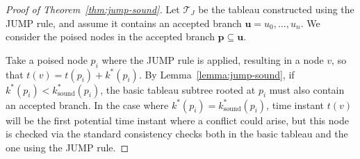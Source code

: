 \documentclass{easychair}
\begin{document}
\begin{proof}[Proof of Theorem~\ref{thm:jump-sound}]
    Let $\mathcal{T}_J$ be the tableau constructed using the JUMP rule, and assume it contains an accepted branch $\mathbf{u} = u_0, \dots, u_n$. We consider the poised nodes in the accepted branch $\mathbf{p} \subseteq \mathbf{u}$. 

    Take a poised node $p_i$ where the JUMP rule is applied, resulting in a node $v$, so that $t(v) = t(p_i) + k^{\ast}(p_i)$. By Lemma~\ref{lemma:jump-sound}, if $k^{\ast}(p_i) < k^{\ast}_{\text{sound}}(p_i)$, the basic tableau subtree rooted at $p_i$ must also contain an accepted branch. In the case where $k^{\ast}(p_i) = k^{\ast}_{\text{sound}}(p_i)$, time instant $t(v)$ will be the first potential time instant where a conflict could arise, but this node is checked via the standard consistency checks both in the basic tableau and the one using the \textsf{JUMP} rule.
\end{proof}
\end{document}
